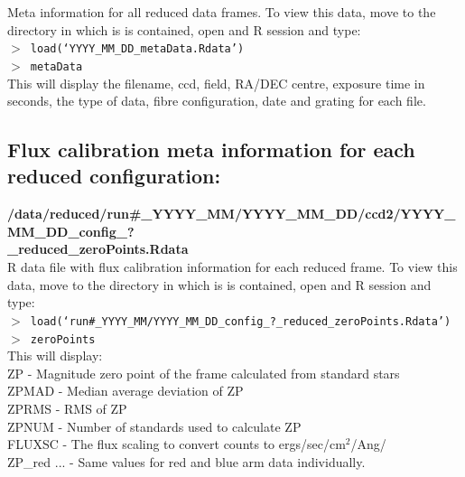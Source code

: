 \documentclass[12pt]{article}
\begin{document}
 Meta information for all reduced data frames. To view this data, move to the directory in which is is contained, open and R session and type:\\
 

\hspace{10mm}  \texttt{$>$ load(`YYYY\_MM\_DD\_metaData.Rdata')}\\

\hspace{10mm}  \texttt{$>$ metaData}\\

 This will display the filename, ccd, field, RA/DEC centre, exposure time in seconds, the type of data, fibre configuration, date and grating for each file.  
  
 
 \subsection{Flux calibration meta information for each reduced configuration:} 
  
  \textbf{/data/reduced/run\#\_YYYY\_MM/YYYY\_MM\_DD/ccd2/YYYY\_MM\_DD\_config\_? \\ \_reduced\_zeroPoints.Rdata} \\
  
  R data file with flux calibration information for each reduced frame. To view this data, move to the directory in which is is contained, open and R session and type:\\
 

\hspace{10mm}  \texttt{$>$ load(`run\#\_YYYY\_MM/YYYY\_MM\_DD\_config\_?\_reduced\_zeroPoints.Rdata')}\\

\hspace{10mm}  \texttt{$>$ zeroPoints}\\

This will display:\\

ZP - Magnitude zero point of the frame calculated from standard stars     \\
ZPMAD - Median average deviation of ZP    \\
ZPRMS - RMS of ZP   \\
ZPNUM - Number of standards used to calculate ZP\\
FLUXSC - The flux scaling to convert counts to ergs/sec/cm$^2$/Ang/\\
ZP\_red ... - Same values for red and blue arm data individually.  \\
\end{document}
